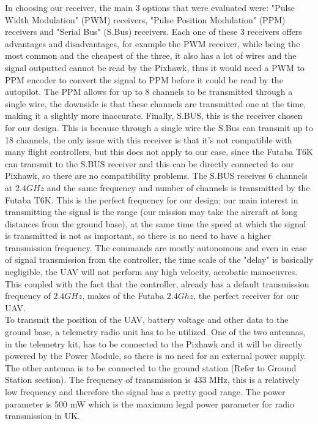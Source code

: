 \documentclass[12pt]{article}
\begin{document}
\noindent In choosing our receiver, the main 3 options that were evaluated were: "Pulse Width Modulation" (PWM) receivers, "Pulse Position Modulation" (PPM) receivers and "Serial Bus" (S.Bus) receivers. Each one of these 3 receivers offers advantages and disadvantages, for example the PWM receiver, while being the most common and the cheapest of the three, it also has a lot of wires and the signal outputted cannot be read by the Pixhawk, thus it would need a PWM to PPM encoder to convert the signal to PPM before it could be read by the autopilot. The PPM allows for up to 8 channels to be transmitted through a single wire, the downside is that these channels are transmitted one at the time, making it a slightly more inaccurate. Finally, S.BUS, this is the receiver chosen for our design. This is because through a single wire the S.Bus can transmit up to 18 channels, the only issue with this receiver is that it's not compatible with many flight controllers, but this does not apply to our case, since the Futaba T6K can transmit to the S.BUS receiver and this can be directly connected to our Pixhawk, so there are no compatibility problems. The S.BUS receives 6 channels at $2.4GHz$ and the same frequency and number of channels is transmitted by the Futaba T6K. This is the perfect frequency for our design; our main interest in transmitting the signal is the range (our mission may take the aircraft at long distances from the ground base), at the same time the speed at which the signal is transmitted is not as important, so there is no need to have a higher transmission frequency. The commands are mostly autonomous and even in case of signal transmission from the controller, the time scale of the "delay" is basically negligible, the UAV will not perform any high velocity, acrobatic manoeuvres. This coupled with the fact that the controller, already has a default transmission frequency of $2.4GHz$, makes of the Futaba $2.4Ghz$, the perfect receiver for our UAV. \cite{SENSOR2}\cite{SENSOR3} \\

\noindent To transmit the position of the UAV, battery voltage and other data to the ground base, a telemetry radio unit has to be utilized. One of the two antennas, in the telemetry kit, has to be connected to the Pixhawk and it will be directly powered by the Power Module, so there is no need for an external power supply. The other antenna is to be connected to the ground station (Refer to Ground Station section). The frequency of transmission is 433 MHz, this is a relatively low frequency and therefore the signal has a pretty good range. The power parameter is 500 mW which is the maximum legal power parameter for radio transmission in UK. \cite{SENSOR3} \cite{SENSOR4} \\
\end{document}
